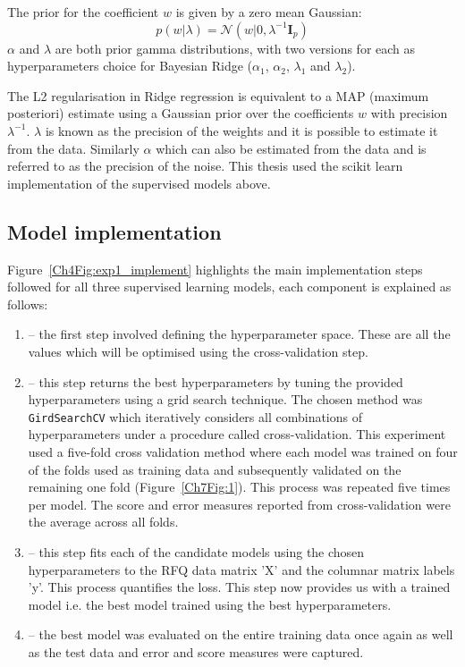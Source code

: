 \begin{description}
    The prior for the coefficient $w$ is given by a zero mean Gaussian:
    \begin{equation}
        p(w|\lambda) = \mathcal{N} (w|0,\lambda^{-1}\mathbf{I}_p)
    \end{equation}
    $\alpha$ and $\lambda$ are both prior gamma distributions, with two versions for each as hyperparameters choice for Bayesian Ridge ($\alpha_1$, $\alpha_2$, $\lambda_1$ and $\lambda_2$).

    The L2 regularisation in Ridge regression is equivalent to a MAP (maximum posteriori) estimate using a Gaussian prior over the coefficients $w$ with precision $\lambda^{-1}$. $\lambda$ is known as the precision of the weights and it is possible to estimate it from the data. Similarly $\alpha$ which can also be estimated from the data and is referred to as the precision of the noise. This thesis used the scikit learn implementation \autocite{scikit-learn} of the supervised models above.
\end{description}

\subsection{Model implementation}

Figure~\ref{Ch4Fig:exp1_implement} highlights the main implementation steps followed for all three supervised learning models, each component is explained as follows:

\begin{enumerate}
    \item {} -- the first step involved defining the hyperparameter space. These are all the values which will be optimised using the cross-validation step. 
    \item {} -- this step returns the best hyperparameters by tuning the provided hyperparameters using a grid search technique. The chosen method was \texttt{GirdSearchCV} which iteratively considers all combinations of hyperparameters under a procedure called cross-validation. This experiment used a five-fold cross validation method where each model was trained on four of the folds used as training data and subsequently validated on the remaining one fold (Figure~\ref{Ch7Fig:1}). This process was repeated five times per model. The score and error measures reported from cross-validation were the average across all folds. 
    \item {} -- this step fits each of the candidate models using the chosen hyperparameters to the RFQ data matrix 'X' and the columnar matrix labels 'y'. This process quantifies the loss. This step now provides us with a trained model  i.e. the best model trained using the best hyperparameters.
    \item {} -- the best model was evaluated on the entire training data once again as well as the test data and error and score measures were captured.
\end{enumerate}

